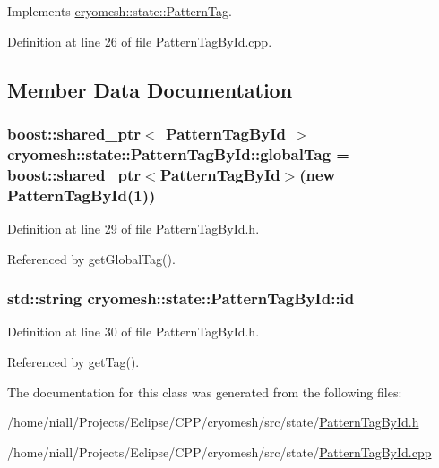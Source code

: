 \-Implements \hyperlink{classcryomesh_1_1state_1_1PatternTag_a17830f089a443437fa736460e231706e}{cryomesh\-::state\-::\-Pattern\-Tag}.



\-Definition at line 26 of file \-Pattern\-Tag\-By\-Id.\-cpp.



\subsection{\-Member \-Data \-Documentation}
\hypertarget{classcryomesh_1_1state_1_1PatternTagById_a691a6ad8390ea3badf22bb88bade46cb}{
\subsubsection[{global\-Tag}]{\setlength{\rightskip}{0pt plus 5cm}boost\-::shared\-\_\-ptr$<$ {\bf \-Pattern\-Tag\-By\-Id} $>$ {\bf cryomesh\-::state\-::\-Pattern\-Tag\-By\-Id\-::global\-Tag} = boost\-::shared\-\_\-ptr$<${\bf \-Pattern\-Tag\-By\-Id}$>$(new {\bf \-Pattern\-Tag\-By\-Id}(1))}}\label{classcryomesh_1_1state_1_1PatternTagById_a691a6ad8390ea3badf22bb88bade46cb}


\-Definition at line 29 of file \-Pattern\-Tag\-By\-Id.\-h.



\-Referenced by get\-Global\-Tag().

\hypertarget{classcryomesh_1_1state_1_1PatternTagById_a9470fbc97fc84afd2eeae7b5e9166715}{
\subsubsection[{id}]{\setlength{\rightskip}{0pt plus 5cm}std\-::string {\bf cryomesh\-::state\-::\-Pattern\-Tag\-By\-Id\-::id}}}\label{classcryomesh_1_1state_1_1PatternTagById_a9470fbc97fc84afd2eeae7b5e9166715}


\-Definition at line 30 of file \-Pattern\-Tag\-By\-Id.\-h.



\-Referenced by get\-Tag().



\-The documentation for this class was generated from the following files\-:\begin{DoxyCompactItemize}
\item 
/home/niall/\-Projects/\-Eclipse/\-C\-P\-P/cryomesh/src/state/\hyperlink{PatternTagById_8h}{\-Pattern\-Tag\-By\-Id.\-h}\item 
/home/niall/\-Projects/\-Eclipse/\-C\-P\-P/cryomesh/src/state/\hyperlink{PatternTagById_8cpp}{\-Pattern\-Tag\-By\-Id.\-cpp}\end{DoxyCompactItemize}
